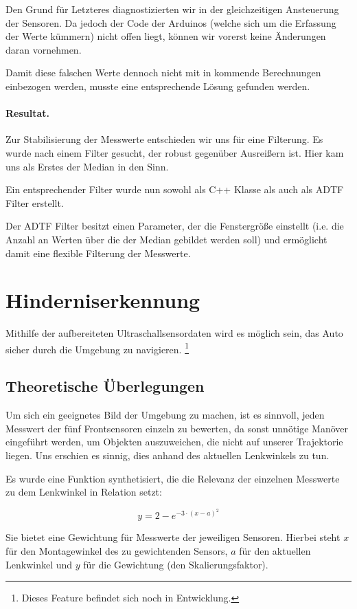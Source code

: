 \documentclass[a4paper,12pt]{report}
\begin{document}
	Den Grund für Letzteres diagnostizierten wir in der gleichzeitigen Ansteuerung der Sensoren.
	Da jedoch der Code der Arduinos (welche sich um die Erfassung der Werte kümmern) nicht offen liegt, können wir vorerst keine Änderungen daran vornehmen.
	
	Damit diese falschen Werte dennoch nicht mit in kommende Berechnungen einbezogen werden, musste eine entsprechende Lösung gefunden werden.

	\paragraph{Resultat.}
	Zur Stabilisierung der Messwerte entschieden wir uns für eine Filterung.
	Es wurde nach einem Filter gesucht, der robust gegenüber Ausreißern ist.
	Hier kam uns als Erstes der Median in den Sinn.
	
	Ein entsprechender Filter wurde nun sowohl als C++ Klasse als auch als ADTF Filter erstellt.

	Der ADTF Filter besitzt einen Parameter, der die Fenstergröße einstellt (i.e. die Anzahl an Werten über die der Median gebildet werden soll) und ermöglicht damit eine flexible Filterung der Messwerte.

\section{Hinderniserkennung}
	
	Mithilfe der aufbereiteten Ultraschallsensordaten wird es möglich sein, das Auto sicher durch die Umgebung zu navigieren.
	\footnote{Dieses Feature befindet sich noch in Entwicklung.}
	
\subsection{Theoretische Überlegungen}
	
	Um sich ein geeignetes Bild der Umgebung zu machen, ist es sinnvoll, jeden  Messwert der fünf Frontsensoren einzeln zu bewerten, da sonst unnötige Manöver eingeführt werden, um Objekten auszuweichen, die nicht auf unserer Trajektorie liegen.
	Uns erschien es sinnig, dies anhand des aktuellen Lenkwinkels zu tun.
	
	Es wurde eine Funktion synthetisiert, die die Relevanz der einzelnen Messwerte zu dem Lenkwinkel in Relation setzt:
	
		\[y=2-e^{-3 \cdot \left( x-a \right)^2}\]
	
	Sie bietet eine Gewichtung für Messwerte der jeweiligen Sensoren.
	Hierbei steht $x$ für den Montagewinkel des zu gewichtenden Sensors, $a$ für den aktuellen Lenkwinkel und $y$ für die Gewichtung (den Skalierungsfaktor).
	
\end{document}
